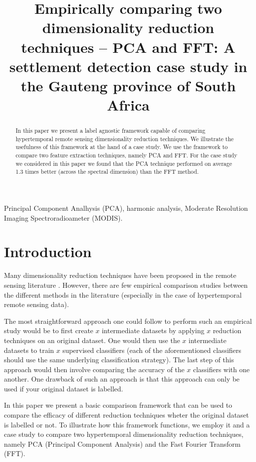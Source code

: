 \documentclass{article}
\title{Empirically comparing two dimensionality reduction techniques -- PCA and FFT: A settlement detection case study in the Gauteng province of South Africa}
\begin{document}
%
\maketitle
%
\begin{abstract}
In this paper we present a label agnostic framework capable of comparing hypertemporal remote sensing dimensionality reduction techniques. 
We illustrate the usefulness of this framework at the hand of a case study. We use the framework to compare two 
feature extraction techniques, namely PCA and FFT. 
For the case study we considered in this paper we found that the PCA technique performed on average 1.3 times better (across the spectral dimension) than the FFT method.
\end{abstract}
%
\begin{keywords}
Principal Component Analhysis (PCA), harmonic analysis, Moderate Resolution Imaging Spectroradioameter (MODIS).
\end{keywords}
%

\section{Introduction}
\label{sec:intro}

Many dimensionality reduction techniques have been proposed in the remote sensing literature \cite{grobler2012}. However, there are few empirical comparison studies between the different methods
in the literature (especially in the case of hypertemporal remote sensing data). 

The most straightforward approach one could follow to perform such an empirical 
study would be to first create $x$ intermediate datasets by applying $x$ reduction techniques on an original dataset. One would then use the $x$ intermediate 
datasets to train $x$ supervised classifiers (each of the aforementioned classifiers should use the same underlying classification strategy). The last step of this approach would then 
involve comparing the accuracy of the $x$ classifiers with one another. One drawback of such an approach is that this approach can only be used if your original dataset is 
labelled. 

In this paper we present a basic comparison framework that can be used to compare the 
efficacy of different reduction techniques wheter the original dataset is labelled or not. To illustrate how this framework functions, we employ it and a case study to compare two hypertemporal 
dimensionality reduction techniques, namely PCA (Principal Component Analysis) and the Fast Fourier Transform (FFT).
\end{document}
